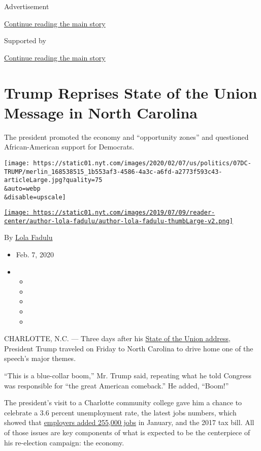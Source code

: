 Advertisement

\protect\hyperlink{after-top}{Continue reading the main story}

Supported by

\protect\hyperlink{after-sponsor}{Continue reading the main story}

\hypertarget{trump-reprises-state-of-the-union-message-in-north-carolina}{%
\section{Trump Reprises State of the Union Message in North
Carolina}\label{trump-reprises-state-of-the-union-message-in-north-carolina}}

The president promoted the economy and ``opportunity zones'' and
questioned African-American support for Democrats.

\texttt{[image: https://static01.nyt.com/images/2020/02/07/us/politics/07DC-TRUMP/merlin\_168538515\_1b553af3-4586-4a3c-a6fd-a2773f593c43-articleLarge.jpg?quality=75\\\&auto=webp\\\&disable=upscale]}

\href{https://www.nytimes.com/by/lola-fadulu}{\texttt{[image: https://static01.nyt.com/images/2019/07/09/reader-center/author-lola-fadulu/author-lola-fadulu-thumbLarge-v2.png]}}

By \href{https://www.nytimes.com/by/lola-fadulu}{Lola Fadulu}

\begin{itemize}
\item
  Feb. 7, 2020
\item
  \begin{itemize}
  \item
  \item
  \item
  \item
  \item
  \end{itemize}
\end{itemize}

CHARLOTTE, N.C. --- Three days after his
\href{https://www.nytimes.com/2020/02/05/us/politics/trump-state-of-the-union.html}{State
of the Union address}, President Trump traveled on Friday to North
Carolina to drive home one of the speech's major themes.

``This is a blue-collar boom,'' Mr. Trump said, repeating what he told
Congress was responsible for ``the great American comeback.'' He added,
``Boom!''

The president's visit to a Charlotte community college gave him a chance
to celebrate a 3.6 percent unemployment rate, the latest jobs numbers,
which showed that
\href{https://www.nytimes.com/2020/02/07/business/january-jobs-report.html}{employers
added 255,000 jobs} in January, and the 2017 tax bill. All of those
issues are key components of what is expected to be the centerpiece of
his re-election campaign: the economy.

